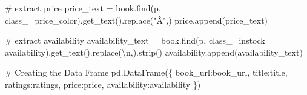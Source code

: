 \documentclass[
  letterpaper,
  DIV=11,
  numbers=noendperiod]{scrreprt}
\newenvironment{Shaded}{\begin{snugshade}}{\end{snugshade}}
\newcommand{\CharTok}[1]{\textcolor[rgb]{0.13,0.47,0.30}{#1}}
\newcommand{\CommentTok}[1]{\textcolor[rgb]{0.37,0.37,0.37}{#1}}
\newcommand{\NormalTok}[1]{\textcolor[rgb]{0.00,0.23,0.31}{#1}}
\newcommand{\OperatorTok}[1]{\textcolor[rgb]{0.37,0.37,0.37}{#1}}
\newcommand{\StringTok}[1]{\textcolor[rgb]{0.13,0.47,0.30}{#1}}
\begin{document}
\begin{Shaded}
\begin{Highlighting}[]
        \CommentTok{\# extract price }
\NormalTok{        price\_text }\OperatorTok{=}\NormalTok{ book.find(}\StringTok{\textquotesingle{}p\textquotesingle{}}\NormalTok{, class\_}\OperatorTok{=}\StringTok{\textquotesingle{}price\_color\textquotesingle{}}\NormalTok{).get\_text().replace(}\StringTok{"Â"}\NormalTok{,}\StringTok{\textquotesingle{}\textquotesingle{}}\NormalTok{)}
\NormalTok{        price.append(price\_text)}

        \CommentTok{\# extract availability }
\NormalTok{        availability\_text }\OperatorTok{=}\NormalTok{ book.find(}\StringTok{\textquotesingle{}p\textquotesingle{}}\NormalTok{, class\_}\OperatorTok{=}\StringTok{\textquotesingle{}instock availability\textquotesingle{}}\NormalTok{).get\_text().replace(}\StringTok{\textquotesingle{}}\CharTok{\textbackslash{}n}\StringTok{\textquotesingle{}}\NormalTok{,}\StringTok{\textquotesingle{}\textquotesingle{}}\NormalTok{).strip()}
\NormalTok{        availability.append(availability\_text)}
    



\CommentTok{\# Creating the Data Frame }
\NormalTok{pd.DataFrame(\{}
    \StringTok{\textquotesingle{}book\_url\textquotesingle{}}\NormalTok{:book\_url,}
    \StringTok{\textquotesingle{}title\textquotesingle{}}\NormalTok{:title,}
    \StringTok{\textquotesingle{}ratings\textquotesingle{}}\NormalTok{:ratings,}
    \StringTok{\textquotesingle{}price\textquotesingle{}}\NormalTok{:price,}
    \StringTok{\textquotesingle{}availability\textquotesingle{}}\NormalTok{:availability}
\NormalTok{\})}
\end{Highlighting}
\end{Shaded}
\end{document}
